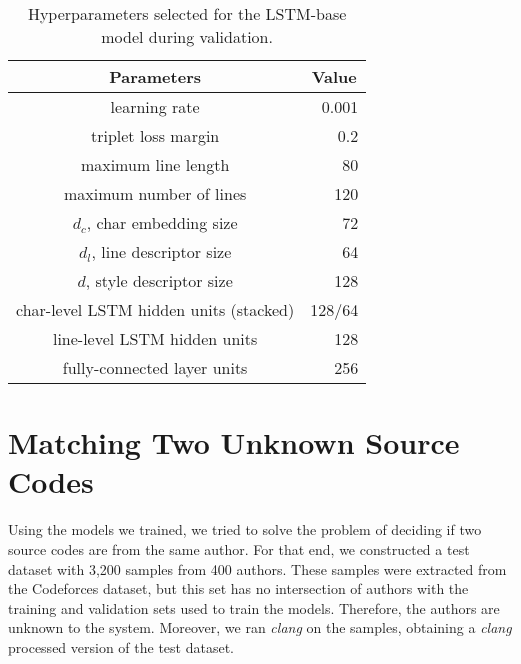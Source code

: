 \begin{table}[htbp]
	\centering
	\begin{tabular}{c|r}
		\hline
		\textbf{Parameters}           & \multicolumn{1}{c}{\textbf{Value}} \\ \hline
		learning rate   & 0.001                        \\ \hline
		triplet loss margin   & 0.2                        \\ \hline
		maximum line length   & 80                        \\ \hline
		maximum number of lines   & 120                            \\ \hline
		$d_c$, char embedding size   & 72                           \\ \hline
		$d_l$, line descriptor size  & 64                            \\ \hline
		$d$, style descriptor size & 128                            \\ \hline
		char-level LSTM hidden units (stacked) & 128/64                            \\ \hline
		line-level LSTM hidden units & 128                            \\ \hline
		fully-connected layer units  & 256                            \\ \hline
	\end{tabular}
	\caption{Hyperparameters selected for the LSTM-base model during validation.}
	\label{tab:lstm_hyper}
\end{table}

\section{Matching Two Unknown Source Codes}

Using the models we trained, we tried to solve the problem of deciding if two source codes are from the same author. For that end, we constructed a test dataset with 3,200 samples from 400 authors. These samples were extracted from the Codeforces dataset, but this set has no intersection of authors with the training and validation sets used to train the models. Therefore, the authors are unknown to the system. Moreover, we ran \textit{clang} on the samples, obtaining a \textit{clang} processed version of the test dataset.